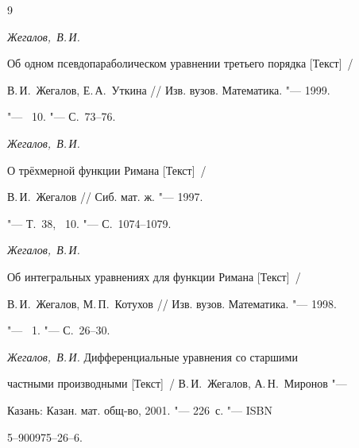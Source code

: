 \begin{thebibliography}{9}


\item


\emph{Жегалов,~В.\,И.}


Об одном псевдопараболическом уравнении третьего порядка [Текст]~/


В.\,И.~Жегалов, Е.\,А.~Уткина /\!/ Изв. вузов. Математика. "--- 1999.


"--- \No~10. "--- С.~73--76.





\item


\emph{Жегалов,~В.\,И.}


О трёхмерной функции Римана  [Текст]~/


В.\,И.~Жегалов /\!/ Сиб. мат. ж. "--- 1997.


"--- Т.~38, \No~10. "--- С.~1074--1079.





\item


\emph{Жегалов,~В.\,И.}


Об интегральных уравнениях для функции Римана [Текст]~/


В.\,И.~Жегалов, М.\,П.~Котухов /\!/ Изв. вузов. Математика. "--- 1998.


"--- \No~1. "--- С.~26--30.





\item


\emph{Жегалов,~В.\,И.} Дифференциальные уравнения со старшими


частными производными [Текст]~/ В.\,И.~Жегалов, А.\,Н.~Миронов "---


Казань: Казан. мат. общ-во, 2001. "--- 226~с. "--- ISBN


5--900975--26--6.





\end{thebibliography}





\makeengtitle



















